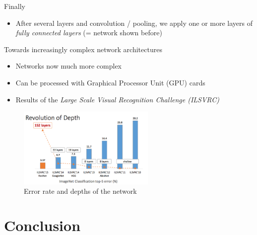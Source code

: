 \documentclass[ignorenonframetext,]{beamer}
\providecommand{\tightlist}{%
  \setlength{\itemsep}{0pt}\setlength{\parskip}{0pt}}
\begin{document}
\begin{frame}{Finally}
\protect\hypertarget{finally}{}

\begin{itemize}
\tightlist
\item
  After several layers and convolution / pooling, we apply one or more
  layers of \emph{fully connected layers} (= network shown before)
\end{itemize}

\end{frame}

\begin{frame}{Towards increasingly complex network architectures}
\protect\hypertarget{towards-increasingly-complex-network-architectures}{}

\begin{itemize}
\item
  Networks now much more complex
\item
  Can be processed with Graphical Processor Unit (GPU) cards
\item
  Results of the \emph{Large Scale Visual Recognition Challenge
  (ILSVRC)}
\end{itemize}

\begin{figure}
\centering
\includegraphics[width=2.60417in,height=\textheight]{depth_error.png}
\caption{Error rate and depths of the network}
\end{figure}

\end{frame}

\hypertarget{conclusion}{%
\section{Conclusion}\label{conclusion}}
\end{document}
